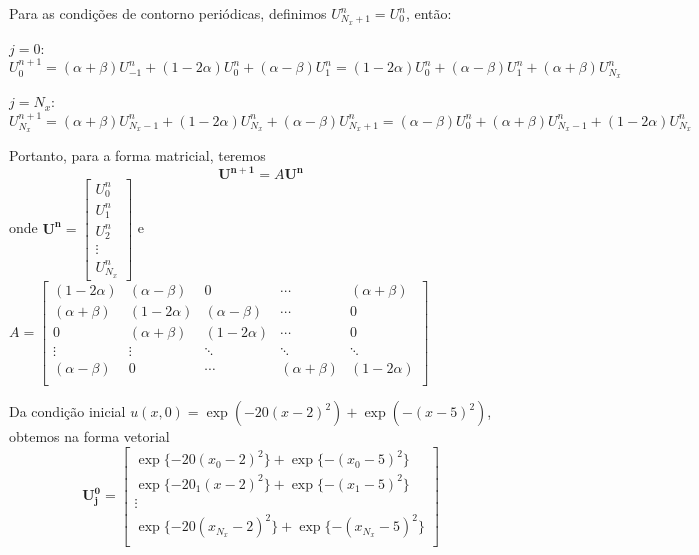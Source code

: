 \documentclass[12pt, a4paper]{article}
\renewcommand{\bf}[1]{\mathbf{#1}}
\begin{document}
    \newpage
    
    Para as condições de contorno periódicas, definimos $U_{N_x+1}^n = U_0^n$, então:

    $j = 0$:
    \[U_0^{n+1} = (\alpha+\beta)U_{-1}^n + (1-2\alpha)U_0^n + (\alpha-\beta)U_{1}^n = (1-2\alpha)U_0^n + (\alpha-\beta)U_{1}^n + (\alpha+\beta)U_{N_x}^n\]

    $j = N_x$:
    \[U_{N_x}^{n+1} = (\alpha+\beta)U_{N_x-1}^n + (1-2\alpha)U_{N_x}^n + (\alpha-\beta)U_{N_x+1}^n = (\alpha-\beta)U_{0}^n + (\alpha+\beta)U_{N_x-1}^n + (1-2\alpha)U_{N_x}^n\]

    Portanto, para a forma matricial, teremos
    \begin{equation}
        \bf{U^{n+1}} = A\bf{U^n}
    \end{equation}
    onde $\bf{U^n} = \begin{bmatrix}
        U_0^n \\ U_1^n \\ U_2^n \\ \vdots \\ U_{N_x}^n
    \end{bmatrix}$ e $A = \begin{bmatrix}
        (1-2\alpha) & (\alpha-\beta) & 0 & \cdots & (\alpha+\beta)\\
        (\alpha+\beta) & (1-2\alpha) & (\alpha-\beta) & \cdots & 0\\
        0 & (\alpha+\beta) & (1-2\alpha) & \cdots & 0\\
        \vdots & \vdots & \ddots & \ddots & \ddots\\
        (\alpha-\beta) & 0 & \cdots & (\alpha+\beta) & (1-2\alpha)\\
    \end{bmatrix}$

    Da condição inicial $u(x,0) = \exp(-20{(x-2)}^2)+\exp(-{(x-5)}^2)$, obtemos na forma vetorial
    \[\bf{U_j^0} = \begin{bmatrix}
        \exp\{-20{(x_0-2)}^2\}+\exp\{-{(x_0-5)}^2\}\\
        \exp\{-20{_1(x-2)}^2\}+\exp\{-{(x_1-5)}^2\}\\
        \vdots\\
        \exp\{-20{(x_{N_x}-2)}^2\}+\exp\{-{(x_{N_x}-5)}^2\}\\
    \end{bmatrix}\]
\end{document}
